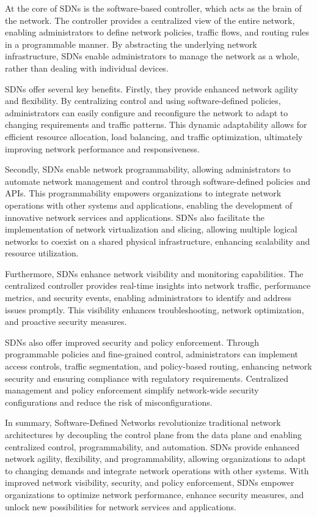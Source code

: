 \documentclass[
12pt,
oneside, 
onehalfspacing, 
nolistspacing, 
parskip, 
chapterinoneline, 
]{AASTCOMPUTER}
\begin{document}
At the core of SDNs is the software-based controller, which acts as the brain of the network. The controller provides a centralized view of the entire network, enabling administrators to define network policies, traffic flows, and routing rules in a programmable manner. By abstracting the underlying network infrastructure, SDNs enable administrators to manage the network as a whole, rather than dealing with individual devices.

SDNs offer several key benefits. Firstly, they provide enhanced network agility and flexibility. By centralizing control and using software-defined policies, administrators can easily configure and reconfigure the network to adapt to changing requirements and traffic patterns. This dynamic adaptability allows for efficient resource allocation, load balancing, and traffic optimization, ultimately improving network performance and responsiveness.

Secondly, SDNs enable network programmability, allowing administrators to automate network management and control through software-defined policies and APIs. This programmability empowers organizations to integrate network operations with other systems and applications, enabling the development of innovative network services and applications. SDNs also facilitate the implementation of network virtualization and slicing, allowing multiple logical networks to coexist on a shared physical infrastructure, enhancing scalability and resource utilization.

Furthermore, SDNs enhance network visibility and monitoring capabilities. The centralized controller provides real-time insights into network traffic, performance metrics, and security events, enabling administrators to identify and address issues promptly. This visibility enhances troubleshooting, network optimization, and proactive security measures.

SDNs also offer improved security and policy enforcement. Through programmable policies and fine-grained control, administrators can implement access controls, traffic segmentation, and policy-based routing, enhancing network security and ensuring compliance with regulatory requirements. Centralized management and policy enforcement simplify network-wide security configurations and reduce the risk of misconfigurations.

In summary, Software-Defined Networks revolutionize traditional network architectures by decoupling the control plane from the data plane and enabling centralized control, programmability, and automation. SDNs provide enhanced network agility, flexibility, and programmability, allowing organizations to adapt to changing demands and integrate network operations with other systems. With improved network visibility, security, and policy enforcement, SDNs empower organizations to optimize network performance, enhance security measures, and unlock new possibilities for network services and applications.
\end{document}
